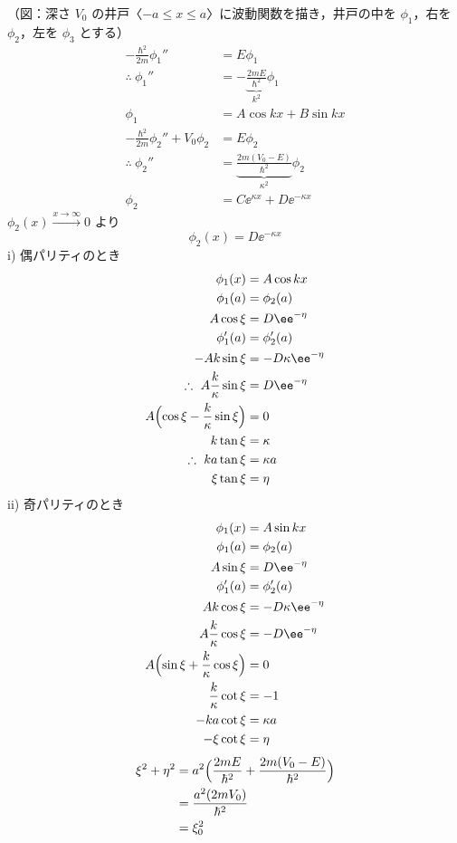 （図：深さ $V_{0}$ の井戸〈$-a\le x\le a$〉に波動関数を描き，井戸の中を $\phi_{1}$，右を $\phi_{2}$，左を $\phi_{3}$ とする）
\begin{align*}
-\frac{\hbar^{2}}{2m}\phi_{1}''&=E\phi_{1}\\
\therefore\ \phi_{1}''&=-\underbrace{\frac{2mE}{\hbar^{2}}}_{k^{2}}\phi_{1}\\
\phi_{1}&=A\cos kx+B\sin kx\\
-\frac{\hbar^{2}}{2m}\phi_{2}''+V_{0}\phi_{2}&=E\phi_{2}\\
\therefore\ \phi_{2}''&=\underbrace{\frac{2m(V_{0}-E)}{\hbar^{2}}}_{\kappa^{2}}\phi_{2}\\
\phi_{2}&=C\ee^{\kappa x}+D\ee^{-\kappa x}
\end{align*}
$\phi_{2}(x)\xrightarrow{x\to\infty}0$ より
\[ \phi_{2}(x)=D\ee^{-\kappa x} \]
i) 偶パリティのとき
\begin{align*}
\phi_{1}(x)&=A\cos kx\\
\phi_{1}(a)&=\phi_{2}(a)\\
A\cos\xi&=D\ee^{-\eta}\\
\phi_{1}'(a)&=\phi_{2}'(a)\\
-Ak\sin\xi&=-D\kappa\ee^{-\eta}\\
\therefore\ A\frac{k}{\kappa}\sin\xi&=D\ee^{-\eta}\\
A\Bigl(\cos\xi-\frac{k}{\kappa}\sin\xi\Bigr)&=0\\
k\tan\xi&=\kappa\\
\therefore\ ka\tan\xi&=\kappa a\\
\xi\tan\xi&=\eta
\end{align*}
ii) 奇パリティのとき
\begin{align*}
\phi_{1}(x)&=A\sin kx\\
\phi_{1}(a)&=\phi_{2}(a)\\
A\sin\xi&=D\ee^{-\eta}\\
\phi_{1}'(a)&=\phi_{2}'(a)\\
Ak\cos\xi&=-D\kappa\ee^{-\eta}\\
A\frac{k}{\kappa}\cos\xi&=-D\ee^{-\eta}\\
A\Bigl(\sin\xi+\frac{k}{\kappa}\cos\xi\Bigr)&=0\\
\frac{k}{\kappa}\cot\xi&=-1\\
-ka\cot\xi&=\kappa a\\
-\xi\cot\xi&=\eta
\end{align*}
\begin{align*}
\xi^{2}+\eta^{2}&=a^{2}\Bigl(\frac{2mE}{\hbar^{2}}+\frac{2m(V_{0}-E)}{\hbar^{2}}\Bigr)\\
&=\frac{a^{2}(2mV_{0})}{\hbar^{2}}\\
&=\xi_{0}^{2}
\end{align*}
